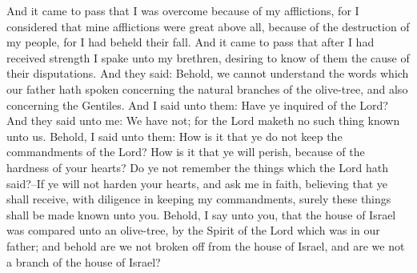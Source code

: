 And it came to pass that I was overcome because of my afflictions, for I considered that mine afflictions were great above all, because of the destruction of my people, for I had beheld their fall.
\bverse \iffalse And it came to pass that after I had received strength I spake unto my brethren, desiring to know of them the cause of their disputations. \fi
And it came to pass that after I had received strength I spake unto my brethren, desiring to know of them the cause of their disputations.
\bverse \iffalse And they said: Behold, we cannot understand the words which our father hath spoken concerning the natural branches of the olive-tree, and also concerning the Gentiles. \fi
And they said: Behold, we cannot understand the words which our father hath spoken concerning the natural branches of the olive-tree, and also concerning the Gentiles.
\bverse \iffalse And I said unto them: Have ye inquired of the Lord? \fi
And I said unto them: Have ye inquired of the Lord?
\bverse \iffalse And they said unto me: We have not; for the Lord maketh no such thing known unto us. \fi
And they said unto me: We have not; for the Lord maketh no such thing known unto us.
\bverse \iffalse Behold, I said unto them: How is it that ye do not keep the commandments of the Lord? How is it that ye will perish, because of the hardness of your hearts? \fi
Behold, I said unto them: How is it that ye do not keep the commandments of the Lord? How is it that ye will perish, because of the hardness of your hearts?
\bverse \iffalse Do ye not remember the things which the Lord hath said?--If ye will not harden your hearts, and ask me in faith, believing that ye shall receive, with diligence in keeping my commandments, surely these things shall be made known unto you. \fi
Do ye not remember the things which the Lord hath said?--If ye will not harden your hearts, and ask me in faith, believing that ye shall receive, with diligence in keeping my commandments, surely these things shall be made known unto you.
\bverse \iffalse Behold, I say unto you, that the house of Israel was compared unto an olive-tree, by the Spirit of the Lord which was in our father; and behold are we not broken off from the house of Israel, and are we not a branch of the house of Israel? \fi
Behold, I say unto you, that the house of Israel was compared unto an olive-tree, by the Spirit of the Lord which was in our father; and behold are we not broken off from the house of Israel, and are we not a branch of the house of Israel?
